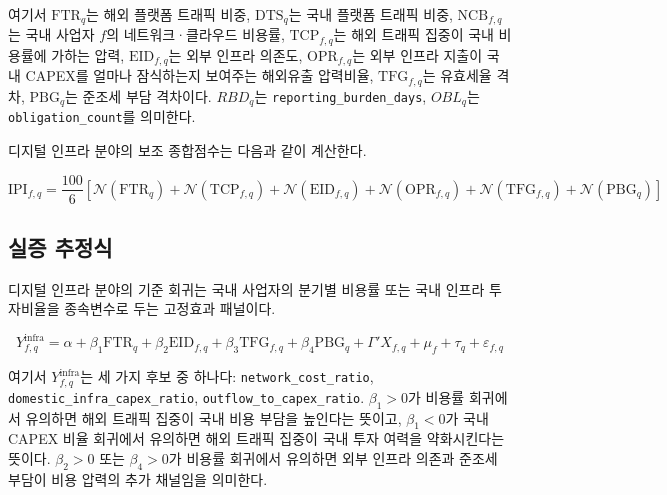 \documentclass[11pt,a4paper]{report}
\begin{document}
여기서 $\mathrm{FTR}_q$는 해외 플랫폼 트래픽 비중, $\mathrm{DTS}_q$는 국내 플랫폼 트래픽 비중, $\mathrm{NCB}_{f,q}$는 국내 사업자 $f$의 네트워크·클라우드 비용률, $\mathrm{TCP}_{f,q}$는 해외 트래픽 집중이 국내 비용률에 가하는 압력, $\mathrm{EID}_{f,q}$는 외부 인프라 의존도, $\mathrm{OPR}_{f,q}$는 외부 인프라 지출이 국내 CAPEX를 얼마나 잠식하는지 보여주는 해외유출 압력비율, $\mathrm{TFG}_{f,q}$는 유효세율 격차, $\mathrm{PBG}_q$는 준조세 부담 격차이다. $RBD_q$는 \texttt{reporting\_burden\_days}, $OBL_q$는 \texttt{obligation\_count}를 의미한다.

디지털 인프라 분야의 보조 종합점수는 다음과 같이 계산한다.

\begin{equation}
\label{eq:infra_subindex}
\mathrm{IPI}_{f,q} = \frac{100}{6}\left[\mathcal{N}(\mathrm{FTR}_q) + \mathcal{N}(\mathrm{TCP}_{f,q}) + \mathcal{N}(\mathrm{EID}_{f,q}) + \mathcal{N}(\mathrm{OPR}_{f,q}) + \mathcal{N}(\mathrm{TFG}_{f,q}) + \mathcal{N}(\mathrm{PBG}_q)\right]
\end{equation}

\subsection{실증 추정식}
디지털 인프라 분야의 기준 회귀는 국내 사업자의 분기별 비용률 또는 국내 인프라 투자비율을 종속변수로 두는 고정효과 패널이다.

\begin{equation}
\label{eq:infra_panel_fe}
Y_{f,q}^{\mathrm{infra}} = \alpha + \beta_1 \mathrm{FTR}_q + \beta_2 \mathrm{EID}_{f,q} + \beta_3 \mathrm{TFG}_{f,q} + \beta_4 \mathrm{PBG}_q + \Gamma' X_{f,q} + \mu_f + \tau_q + \varepsilon_{f,q}
\end{equation}

여기서 $Y_{f,q}^{\mathrm{infra}}$는 세 가지 후보 중 하나다: \texttt{network\_cost\_ratio}, \nolinkurl{domestic_infra_capex_ratio}, \texttt{outflow\_to\_capex\_ratio}. $\beta_1 > 0$가 비용률 회귀에서 유의하면 해외 트래픽 집중이 국내 비용 부담을 높인다는 뜻이고, $\beta_1 < 0$가 국내 CAPEX 비율 회귀에서 유의하면 해외 트래픽 집중이 국내 투자 여력을 약화시킨다는 뜻이다. $\beta_2 > 0$ 또는 $\beta_4 > 0$가 비용률 회귀에서 유의하면 외부 인프라 의존과 준조세 부담이 비용 압력의 추가 채널임을 의미한다.
\end{document}
